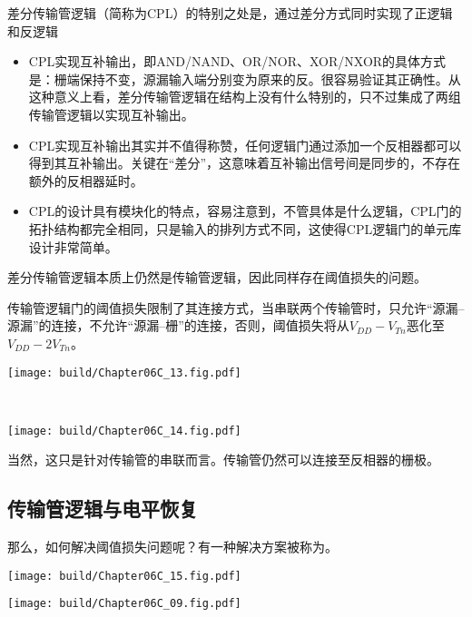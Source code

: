 差分传输管逻辑（简称为CPL）的特别之处是，通过差分方式同时实现了正逻辑和反逻辑
\begin{itemize}
    \item CPL实现互补输出，即AND/NAND、OR/NOR、XOR/NXOR的具体方式是：栅端保持不变，源漏输入端分别变为原来的反。很容易验证其正确性。从这种意义上看，差分传输管逻辑在结构上没有什么特别的，只不过集成了两组传输管逻辑以实现互补输出。
    \item CPL实现互补输出其实并不值得称赞，任何逻辑门通过添加一个反相器都可以得到其互补输出。关键在“差分”，这意味着互补输出信号间是同步的，不存在额外的反相器延时。
    \item CPL的设计具有模块化的特点，容易注意到，不管具体是什么逻辑，CPL门的拓扑结构都完全相同，只是输入的排列方式不同，这使得CPL逻辑门的单元库设计非常简单。
\end{itemize}
差分传输管逻辑本质上仍然是传输管逻辑，因此同样存在阈值损失的问题。


传输管逻辑门的阈值损失限制了其连接方式，当串联两个传输管时，只允许“源漏--源漏”的连接，不允许“源漏--栅”的连接，否则，阈值损失将从$V_{DD}-V_{Tn}$恶化至$V_{DD}-2V_{Tn}$。
\begin{Figure}[传输管的串联]
    \begin{FigureSub}[正确的串联]
        \texttt{[image: build/Chapter06C\_13.fig.pdf]}
    \end{FigureSub}\\ \vspace{1.00cm}
    \begin{FigureSub}[错误的串联]
        \texttt{[image: build/Chapter06C\_14.fig.pdf]}
    \end{FigureSub}
\end{Figure}
当然，这只是针对传输管的串联而言。传输管仍然可以连接至反相器的栅极。

\subsection{传输管逻辑与电平恢复}
那么，如何解决阈值损失问题呢？有一种解决方案被称为。

\begin{Figure}[传输管逻辑与电平恢复]
    \begin{FigureSub}[无电平恢复]
        \texttt{[image: build/Chapter06C\_15.fig.pdf]}
    \end{FigureSub}
    \hspace{0.25cm}
    \begin{FigureSub}[有电平恢复]
        \texttt{[image: build/Chapter06C\_09.fig.pdf]}
    \end{FigureSub}
\end{Figure}

